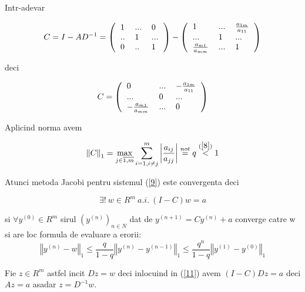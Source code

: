 \documentclass[a4paper,twoside]{book}
\begin{document}
Intr-adevar

\begin{equation*}
C=I-AD^{-1}=\left( 
\begin{tabular}{lll}
1 & ... & 0 \\ 
.. & 1 & ... \\ 
0 & .. & 1%
\end{tabular}%
\right) -\left( 
\begin{tabular}{lll}
1 & ... & $\frac{a_{1m}}{a_{11}}$ \\ 
... & 1 & ... \\ 
$\frac{a_{m1}}{a_{mm}}$ & ... & 1%
\end{tabular}%
\right)
\end{equation*}

deci

\begin{equation*}
C=\left( 
\begin{tabular}{lll}
0 & ... & $-\frac{a_{1m}}{a_{11}}$ \\ 
... & 0 & ... \\ 
$-\frac{a_{m1}}{a_{mm}}$ & ... & 0%
\end{tabular}%
\right)
\end{equation*}

Aplicind norma avem

\begin{equation*}
\left\Vert C\right\Vert _{1}=\max_{j\in \overline{1,m}}\sum_{i=1,i\neq
j}^{m}\left\vert \frac{a_{ij}}{a_{jj}}\right\vert \overset{not}{=}q\overset{(%
\ref{8})}{<}1
\end{equation*}

Atunci metoda Jacobi pentru sistemul (\ref{9}) este convergenta deci

\begin{equation}
\exists !\:w\in R^{m}\:a.i.\:(I-C)w=a  \label{11}
\end{equation}

si $\forall y^{(0)}\in R^{m}$ sirul $(y^{(n)})_{n\in N}$ dat de $%
y^{(n+1)}=Cy^{(n)}+a$ converge catre w si are loc formula de evaluare a
erorii: 
\begin{equation}
\left\Vert y^{(n)}-w\right\Vert _{1}\leq \frac{q}{1-q}\left\Vert
y^{(n)}-y^{(n-1)}\right\Vert _{1}\leq \frac{q^{n}}{1-q}\left\Vert
y^{(1)}-y^{(0)}\right\Vert _{1}  \label{12}
\end{equation}

Fie $z\in R^{m}$ astfel incit $Dz=w$ deci inlocuind in (\ref{11}) avem $%
(I-C)Dz=a$ deci $Az=a$ asadar $z=D^{-1}w$.
\end{document}
